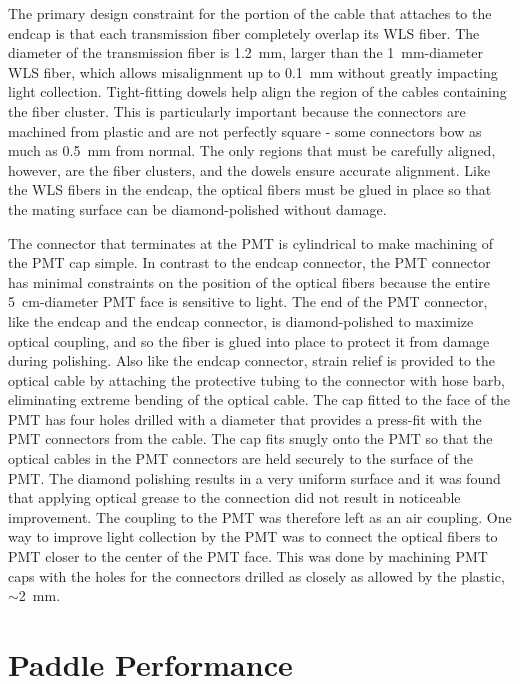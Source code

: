 The primary design constraint for the portion of the cable that attaches to the endcap is that each transmission fiber completely overlap its WLS fiber.  The diameter of the transmission fiber is 1.2~mm, larger than the 1~mm-diameter WLS fiber, which allows misalignment up to 0.1~mm without greatly impacting light collection.  Tight-fitting dowels help align the region of the cables containing the fiber cluster.  This is particularly important because the connectors are machined from plastic and are not perfectly square - some connectors bow as much as 0.5~mm from normal.  The only regions that must be carefully aligned, however, are the fiber clusters, and the dowels ensure accurate alignment.  Like the WLS fibers in the endcap, the optical fibers must be glued in place so that the mating surface can be diamond-polished without damage.  

The connector that terminates at the PMT is cylindrical to make machining of the PMT cap simple.  In contrast to the endcap connector, the PMT connector has minimal constraints on the position of the optical fibers because the entire 5~cm-diameter PMT face is sensitive to light.  The end of the PMT connector, like the endcap and the endcap connector, is diamond-polished to maximize optical coupling, and so the fiber is glued into place to protect it from damage during polishing.    Also like the endcap connector, strain relief is provided to the optical cable by attaching the protective tubing to the connector with hose barb, eliminating extreme bending of the optical cable.    
The cap fitted to the face of the PMT has four holes drilled with a diameter that provides a press-fit with the PMT connectors from the cable.  The cap fits snugly onto the PMT so that the optical cables in the PMT connectors are held securely to the surface of the PMT.  The diamond polishing results in a very uniform surface and it was found that applying optical grease to the connection did not result in noticeable improvement.  The coupling to the PMT was therefore left as an air coupling.  One way to improve light collection by the PMT was to connect the optical fibers to PMT closer to the center of the PMT face.  This was done by machining PMT caps with the holes for the connectors drilled as closely as allowed by the plastic, $\sim$2~mm.


\section{Paddle Performance}
\label{sec:singleVeto}

